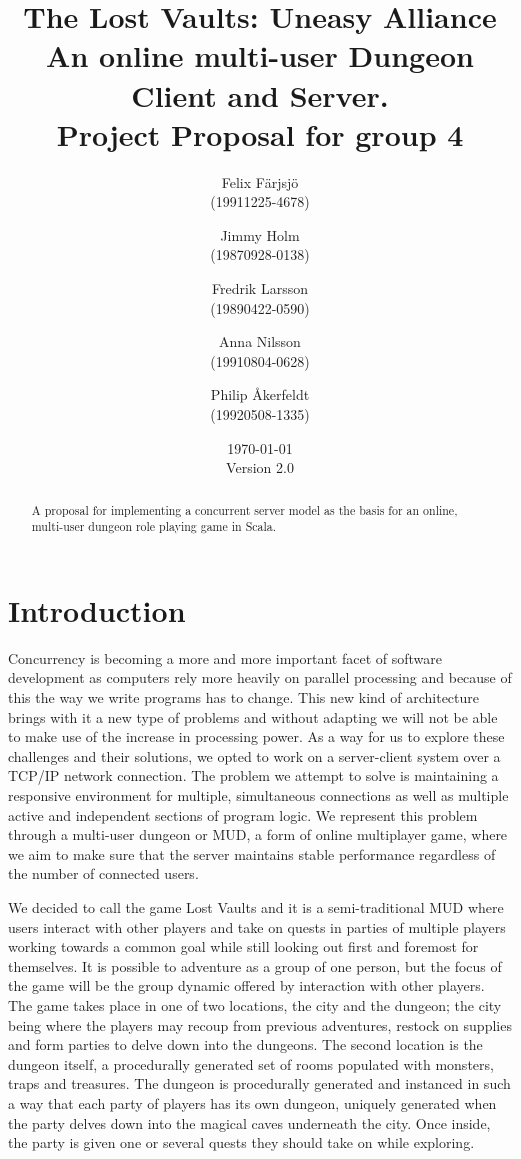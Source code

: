 \documentclass[a4paper]{article}
\title{The Lost Vaults: Uneasy Alliance\\\small{An online multi-user Dungeon Client and Server.}\\\small{Project Proposal for group 4}}
\author{Felix Färjsjö\\(19911225-4678) \and Jimmy Holm\\(19870928-0138) \and Fredrik Larsson\\(19890422-0590) \and Anna Nilsson\\(19910804-0628) \and Philip Åkerfeldt\\(19920508-1335)}
\date{\today\\Version 2.0}
\begin{document}
\maketitle
\newpage
\begin{abstract}
A proposal for implementing a concurrent server model as the basis for an online, multi-user dungeon role playing game in Scala.
\end{abstract}

\tableofcontents
\listoffigures
\newpage
\section{Introduction}
Concurrency is becoming a more and more important facet of software development as computers rely more heavily on parallel processing and because of this the way we write programs has to change. 
This new kind of architecture brings with it a new type of problems and without adapting we will not be able to make use of the increase in processing power. 
As a way for us to explore these challenges and their solutions, we opted to work on a server-client system over a TCP/IP network connection. The problem we attempt to solve is maintaining a responsive 
environment for multiple, simultaneous connections as well as multiple active and independent sections of program logic. We represent this problem through a multi-user dungeon or 
MUD, a form of online multiplayer game, where we aim to make sure that the server maintains stable performance regardless of the number of connected users.

We decided to call the game Lost Vaults and it is a semi-traditional MUD where users interact with other players and take on quests in parties 
of multiple players working towards a common goal while still looking out first and foremost for themselves. It is possible to adventure as a group of one person, but the focus of the 
game will be the group dynamic offered by interaction with other players. 
The game takes place in one of two locations, the city and the dungeon; the city being where the players may recoup from previous adventures, restock on supplies and 
form parties to delve down into the dungeons. The second location is the dungeon itself, a procedurally generated set of rooms populated with monsters, traps and treasures.
The dungeon is procedurally generated and instanced in such a way that each party of players has its own dungeon, uniquely generated when the party delves down into 
the magical caves underneath the city. Once inside, the party is given one or several quests they should take on while exploring.
\end{document}
